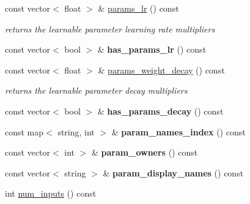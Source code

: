 \begin{DoxyCompactItemize}
\mbox{\label{classcaffe_1_1_net_ae902a7a461c0a693ba1f0d4186ef8e42}} 
const vector$<$ float $>$ \& \mbox{\hyperlink{classcaffe_1_1_net_ae902a7a461c0a693ba1f0d4186ef8e42}{params\+\_\+lr}} () const
\begin{DoxyCompactList}\small\item\em returns the learnable parameter learning rate multipliers \end{DoxyCompactList}\item 
\mbox{\label{classcaffe_1_1_net_ae028e0f6241f6d9f8af19bd855cff8cb}} 
const vector$<$ bool $>$ \& {\bfseries has\+\_\+params\+\_\+lr} () const
\item 
\mbox{\label{classcaffe_1_1_net_a1bc1091f0033a8b6c321f1b50c931996}} 
const vector$<$ float $>$ \& \mbox{\hyperlink{classcaffe_1_1_net_a1bc1091f0033a8b6c321f1b50c931996}{params\+\_\+weight\+\_\+decay}} () const
\begin{DoxyCompactList}\small\item\em returns the learnable parameter decay multipliers \end{DoxyCompactList}\item 
\mbox{\label{classcaffe_1_1_net_aca6119790acd1da41f25d8a2955db232}} 
const vector$<$ bool $>$ \& {\bfseries has\+\_\+params\+\_\+decay} () const
\item 
\mbox{\label{classcaffe_1_1_net_a4bc40bc25f238f2c8f63d806762672ba}} 
const map$<$ string, int $>$ \& {\bfseries param\+\_\+names\+\_\+index} () const
\item 
\mbox{\label{classcaffe_1_1_net_aae4c9fb34c016449eb77537efba6033b}} 
const vector$<$ int $>$ \& {\bfseries param\+\_\+owners} () const
\item 
\mbox{\label{classcaffe_1_1_net_a80126ec711a7eb61dcb45dd93aaf3da4}} 
const vector$<$ string $>$ \& {\bfseries param\+\_\+display\+\_\+names} () const
\item 
\mbox{\label{classcaffe_1_1_net_a6b04ab79ff08386d5a6fd167fd7696a3}} 
int \mbox{\hyperlink{classcaffe_1_1_net_a6b04ab79ff08386d5a6fd167fd7696a3}{num\+\_\+inputs}} () const

\end{DoxyCompactItemize}
